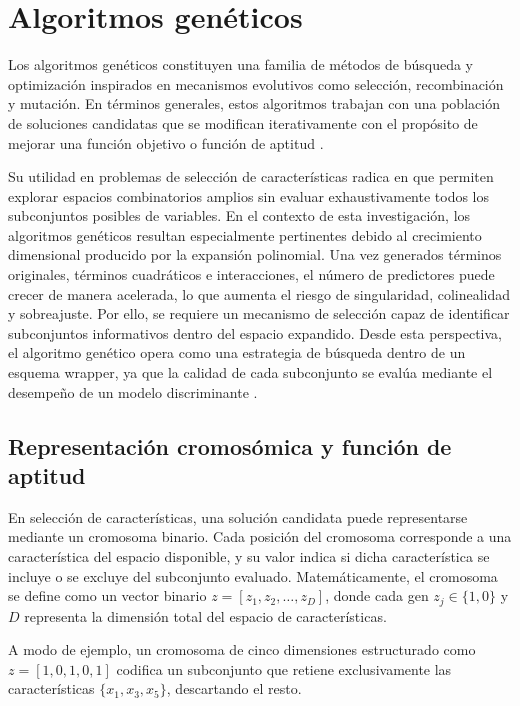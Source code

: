\section{Algoritmos genéticos}

Los algoritmos genéticos constituyen una familia de métodos de búsqueda y optimización inspirados en mecanismos evolutivos como selección, recombinación y mutación. En términos generales, estos algoritmos trabajan con una población de soluciones candidatas que se modifican iterativamente con el propósito de mejorar una función objetivo o función de aptitud \cite{Goldberg1988}.

Su utilidad en problemas de selección de características radica en que permiten explorar espacios combinatorios amplios sin evaluar exhaustivamente todos los subconjuntos posibles de variables. En el contexto de esta investigación, los algoritmos genéticos resultan especialmente pertinentes debido al crecimiento dimensional producido por la expansión polinomial. Una vez generados términos originales, términos cuadráticos e interacciones, el número de predictores puede crecer de manera acelerada, lo que aumenta el riesgo de singularidad, colinealidad y sobreajuste. Por ello, se requiere un mecanismo de selección capaz de identificar subconjuntos informativos dentro del espacio expandido. Desde esta perspectiva, el algoritmo genético opera como una estrategia de búsqueda dentro de un esquema wrapper, ya que la calidad de cada subconjunto se evalúa mediante el desempeño de un modelo discriminante \cite{kohavi1997wrappers}.

\subsection{Representación cromosómica y función de aptitud}

En selección de características, una solución candidata puede representarse mediante un cromosoma binario. Cada posición del cromosoma corresponde a una característica del espacio disponible, y su valor indica si dicha característica se incluye o se excluye del subconjunto evaluado. Matemáticamente, el cromosoma se define como un vector binario $z = [z_1,z_2,\dots,z_D]$, donde cada gen $z_j \in \{1,0\}$ y $D$ representa la dimensión total del espacio de características.

A modo de ejemplo, un cromosoma de cinco dimensiones estructurado como $z = [1,0,1,0,1]$ codifica un subconjunto que retiene exclusivamente las características $\{x_1,x_3,x_5\}$, descartando el resto.

